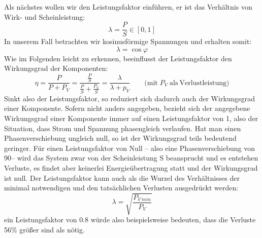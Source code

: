 Als nächstes wollen wir den Leistungsfaktor einführen, er ist das Verhältnis von Wirk- und Scheinleistung:
\begin{equation}
\lambda = \frac{P}{S} \in [0,1]
\end{equation}
In unserem Fall betrachten wir kosinusförmige Spannungen und erhalten somit:
\begin{equation}
\lambda = \cos \varphi
\end{equation}
Wie im Folgenden leicht zu erkennen, beeinflusst der Leistungsfaktor den Wirkungsgrad der Komponenten:
\begin{equation}
\eta = \frac{P}{P+P_V} = \frac{\frac{P}{S}}{\frac{P}{S}+\frac{P_V}{S}} = \frac{\lambda}{\lambda + p_V} \qquad \mathrm{(mit}\;P_V\;\mathrm{als\: Verlustleistung)}
\end{equation}
Sinkt also der Leistungsfaktor, so reduziert sich dadurch auch der Wirkungsgrad einer Komponente.
Sofern nicht anders angegeben, bezieht sich der angegebene Wirkungsgrad einer Komponente immer auf einen Leistungsfaktor von 1, also der Situation, dass Strom und Spannung phasengleich verlaufen.
Hat man einen Phasenverschiebung ungleich null, so ist der Wirkungsgrad teils bedeutend geringer.
Für einen Leistungsfaktor von Null -- also eine Phasenverschiebung von 90\degree -- wird das System zwar von der Scheinleistung S beansprucht und es entstehen Verluste, es findet aber keinerlei Energieübertragung statt und der Wirkungsgrad ist null.
Der Leistungsfaktor kann auch als die Wurzel des Verhältnisses der minimal notwendigen und den tatsächlichen Verlusten ausgedrückt werden:
\begin{equation}
\lambda = \sqrt{\frac{P_{V\:min}}{P_V}}	%
\end{equation}
ein Leistungsfaktor von 0.8 würde also beispielsweise bedeuten, dass die Verluste 56\% größer sind als nötig.


